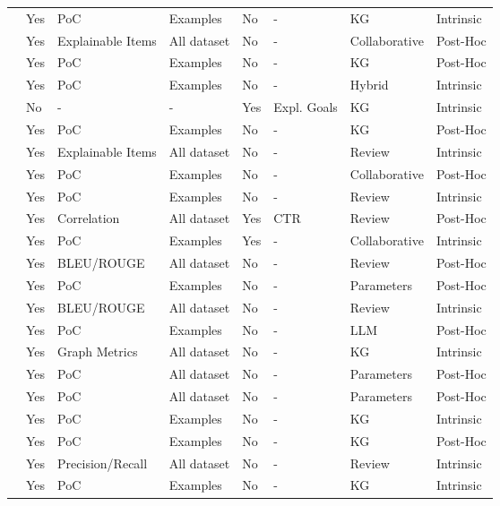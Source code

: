 \begin{xltabular}{\textwidth}{l|l|l|l|l|l|l|l}
    \cite{9607106} & Yes & PoC & Examples & No & - & KG & Intrinsic \\
    \cite{9260076} & Yes & Explainable Items & All dataset & No & - & Collaborative & Post-Hoc \\
    \cite{10776491} & Yes & PoC & Examples & No & - & KG & Post-Hoc \\
    \cite{9005590} & Yes & PoC & Examples & No & - & Hybrid & Intrinsic \\
    \cite{10260804} & No & - & - & Yes & Expl. Goals & KG & Intrinsic \\
    \cite{10683822} & Yes & PoC & Examples & No & - & KG & Post-Hoc \\
    \cite{9079084} & Yes & Explainable Items & All dataset & No & - & Review & Intrinsic \\
    \cite{9836983} & Yes & PoC & Examples & No & - & Collaborative & Post-Hoc \\
    \cite{10873804} & Yes & PoC & Examples & No & - & Review & Intrinsic \\
    \cite{8594883} & Yes & Correlation & All dataset & Yes & CTR & Review & Post-Hoc \\
    \cite{10048787} & Yes & PoC & Examples & Yes & - & Collaborative & Intrinsic \\
    \cite{10446052} & Yes & BLEU/ROUGE & All dataset & No & - & Review & Post-Hoc \\
    \cite{10827288} & Yes & PoC & Examples & No & - & Parameters & Post-Hoc \\
    \cite{9482221} & Yes & BLEU/ROUGE & All dataset & No & - & Review & Intrinsic \\
    \cite{10658914} & Yes & PoC & Examples & No & - & LLM & Post-Hoc \\
    \cite{10334552} & Yes & Graph Metrics & All dataset & No & - & KG & Intrinsic \\
    \cite{10825771} & Yes & PoC & All dataset & No & - & Parameters & Post-Hoc \\
    \cite{10308154} & Yes & PoC & All dataset & No & - & Parameters & Post-Hoc \\
    \cite{10742303} & Yes & PoC & Examples & No & - & KG & Intrinsic \\
    \cite{10623784} & Yes & PoC & Examples & No & - & KG & Post-Hoc \\
    \cite{10884422} & Yes & Precision/Recall & All dataset & No & - & Review & Intrinsic \\
    \cite{SHIMIZU2022107970} & Yes & PoC & Examples & No & - & KG & Intrinsic \\

\end{xltabular}
